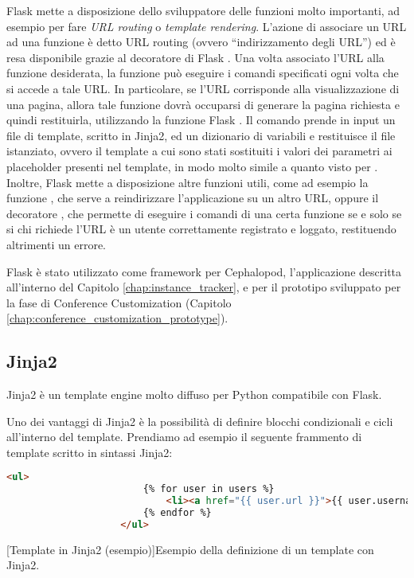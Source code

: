             Flask mette a disposizione dello sviluppatore delle funzioni molto importanti, ad esempio per fare \textit{\ac{URL} routing} o \textit{template rendering}. L'azione di associare un \ac{URL} ad una funzione è detto \ac{URL} routing (ovvero ``indirizzamento degli \ac{URL}'') ed è resa disponibile grazie al decoratore di Flask . Una volta associato l'\ac{URL} alla funzione desiderata, la funzione può eseguire i comandi specificati ogni volta che si accede a tale \ac{URL}. In particolare, se l'\ac{URL} corrisponde alla visualizzazione di una pagina, allora tale funzione dovrà occuparsi di generare la pagina richiesta e quindi restituirla, utilizzando la funzione Flask . Il comando  prende in input un file di template, scritto in Jinja2, ed un dizionario di variabili e restituisce il file istanziato, ovvero il template a cui sono stati sostituiti i valori dei parametri ai placeholder presenti nel template, in modo molto simile a quanto visto per . Inoltre, Flask mette a disposizione altre funzioni utili, come ad esempio la funzione , che serve a reindirizzare l'applicazione su un altro \ac{URL}, oppure il decoratore , che permette di eseguire i comandi di una certa funzione se e solo se si chi richiede l'\ac{URL} è un utente correttamente registrato e loggato, restituendo altrimenti un errore.
            
            Flask è stato utilizzato come framework per Cephalopod, l'applicazione descritta all'interno del Capitolo \ref{chap:instance_tracker}, e per il prototipo sviluppato per la fase di Conference Customization (Capitolo \ref{chap:conference_customization_prototype}).
            
        \subsection{Jinja2} \label{subsec:p;sl;jinja2}
        
            Jinja2 è un template engine molto diffuso per Python compatibile con Flask.
            
            Uno dei vantaggi di Jinja2 è la possibilità di definire blocchi condizionali e cicli all'interno del template. Prendiamo ad esempio il seguente frammento di template scritto in sintassi Jinja2:
            
            \begin{center}
                \begin{lstlisting}[language=html, gobble=18]
                    <ul>
                        {% for user in users %}
                            <li><a href="{{ user.url }}">{{ user.username }}</a></li>
                        {% endfor %}
                    </ul>
                \end{lstlisting}
                \captionsetup{textformat=empty,labelformat=empty} \vspace{-2em}
                [Template in Jinja2 (esempio)]{Esempio della definizione di un template con Jinja2.}
            \end{center}
            
